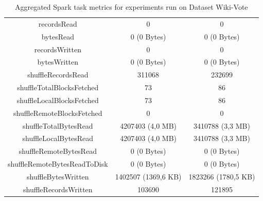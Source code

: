 \documentclass[a4paper,11pt, twoside]{article}
\begin{document}
\begin{table}[h!]
\begin{tabular}{ccc}
                        recordsRead                 & 0                 & 0 \\
                        bytesRead                   & 0 (0 Bytes)       & 0 (0 Bytes) \\
                        recordsWritten              & 0                 & 0 \\
                        bytesWritten                & 0 (0 Bytes)       & 0 (0 Bytes) \\
                        shuffleRecordsRead          & 311068            & 232699 \\
                        shuffleTotalBlocksFetched   & 73                & 86 \\
                        shuffleLocalBlocksFetched   & 73                & 86 \\
                        shuffleRemoteBlocksFetched  & 0                 & 0 \\
                        shuffleTotalBytesRead       & 4207403 (4,0 MB)  & 3410788 (3,3 MB) \\
                        shuffleLocalBytesRead       & 4207403 (4,0 MB)  & 3410788 (3,3 MB) \\
                        shuffleRemoteBytesRead      & 0 (0 Bytes)       & 0 (0 Bytes) \\
                        shuffleRemoteBytesReadToDisk & 0 (0 Bytes)      & 0 (0 Bytes) \\
                        shuffleBytesWritten         & 1402507 (1369,6 KB) & 1823266 (1780,5 KB) \\
                        shuffleRecordsWritten       & 103690            & 121895 \\
            		\bottomrule
            	\end{tabular}
                    \caption{Aggregated Spark task metrics for experiments run on Dataset Wiki-Vote}
                    \label{tab:taskmetrics1}
            \end{table} 
            
    
\end{document}
